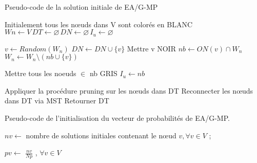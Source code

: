 \cleardoublepage


\begin{algorithm}[H]
\label{alg3:PCSIEAGMP}
\caption{Pseudo-code de la solution initiale de EA/G-MP}
\SetAlgoLined
\DontPrintSemicolon

Initialement tous les nœuds dans V sont colorés en BLANC \;
$W n \gets V \, DT \gets \varnothing \, DN \gets \varnothing \, I_u \gets \varnothing $ \;

$v \gets Random(W_n)$ \;
$ DN \gets DN \cup \{ v \} $ \;
Mettre v NOIR \;
$ nb \gets ON( v ) \cap W_n $ \;
$ W_n \gets W_n \setminus ( nb \cup \{ v \})$ \;

Mettre tous les noeuds $\in$ nb GRIS \;
$I_u \gets nb$ \;


Appliquer la procédure pruning sur les nœuds dans DT \;
Reconnecter les nœuds dans DT via MST \;
Retourner DT \;

\end{algorithm}





\cleardoublepage


\begin{algorithm}[H]
\label{alg3:IVPEAMP}
\caption{Pseudo-code de l'initialisation du vecteur de probabilités de EA/G-MP.}
\SetAlgoLined
\DontPrintSemicolon

$ nv \gets $ nombre de solutions initiales contenant le nœud $v, \forall v \in V$ ;

$ pv \gets$ \( \displaystyle \frac{nv}{Np} \) ,  $\forall v \in V $ \;


\end{algorithm}



\cleardoublepage



